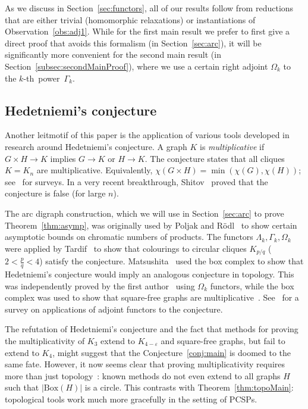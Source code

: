 \documentclass[11pt,a4paper]{scrartcl}
\numberwithin{theorem}{section}
\theoremstyle{definition}
\newcommand{\eps}{\varepsilon}
\newcommand\BBox[1]{\left|\mathrm{Box}(#1)\right|}
\begin{document}
As we discuss in Section~\ref{sec:functors}, all of our results follow from reductions that are either trivial (homomorphic relaxations) or instantiations of Observation~\ref{obs:adj1}.
While for the first main result we prefer to first give a direct proof that avoids this formalism (in Section~\ref{sec:arc}),
it will be significantly more convenient for the second main result (in Section~\ref{subsec:secondMainProof}),
where we use a certain right adjoint $\Omega_k$ to the $k$-th~power~$\Gamma_k$.


\subsection{Hedetniemi's conjecture}

Another leitmotif of this paper is the application of various tools developed in research around Hedetniemi's conjecture.
A graph $K$ is \emph{multiplicative} if $G \times H \to K$ implies $G \to K$ or $H \to K$.
The conjecture states that all cliques $K=K_n$ are multiplicative.
Equivalently, $\chi(G \times H) = \min(\chi(G),\chi(H))$;
see~\cite{zhu1998survey,Sauer01,Tardif08:survey} for surveys.
In a very recent breakthrough, Shitov~\cite{Shitov19} proved that the conjecture is false (for large $n$).

The arc digraph construction, which we will use in Section~\ref{sec:arc} to
prove Theorem~\ref{thm:asymp}, was originally used by Poljak and Rödl~\cite{PoljakR81} to show certain asymptotic bounds on chromatic numbers of products.
The functors $\Lambda_k,\Gamma_k,\Omega_k$ were applied by
Tardif~\cite{Tardif05:jctb} to show that colourings to circular cliques $K_{p/q}$ ($2<\frac{p}{q}<4$) satisfy the conjecture.
Matsushita~\cite{Matsushita17} used the box complex to show that Hedetniemi's conjecture would imply an analogous conjecture in topology.
This was independently proved by the first author~\cite{Wrochna17b} using $\Omega_k$ functors, while the box complex was used to show that square-free graphs are multiplicative~\cite{Wrochna17}.
See~\cite{FoniokT17} for a survey on applications of adjoint functors to the conjecture.

The refutation of Hedetniemi's conjecture  and the fact that methods for proving the multiplicativity of $K_3$ extend to $K_{4-\eps}$ and square-free graphs, but fail to extend to $K_4$, might suggest that the Conjecture~\ref{conj:main} is doomed to the same fate.
However, it now seems clear that proving multiplicativity requires more than just topology~\cite{TardifW18}: known methods do not even extend to all graphs $H$ such that $\BBox{H}$ is a circle.
This contrasts with Theorem~\ref{thm:topoMain}: topological tools work much more gracefully in the setting of PCSPs.
\end{document}
